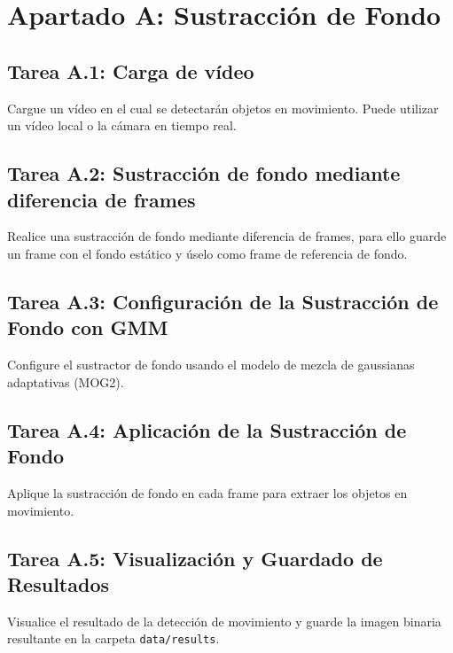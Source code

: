 \chapter{Apartado A: \textbf{Sustracción de Fondo}}
\label{chapter:tarea_a}


\section*{Tarea A.1: Carga de vídeo}
{}
Cargue un vídeo en el cual se detectarán objetos en movimiento. Puede utilizar un vídeo local o la cámara en tiempo real.

\section*{Tarea A.2: Sustracción de fondo mediante diferencia de frames}
{}
Realice una sustracción de fondo mediante diferencia de frames, para ello guarde un frame con el fondo estático y úselo como frame de referencia de fondo.

\section*{Tarea A.3: Configuración de la Sustracción de Fondo con GMM}
{}

Configure el sustractor de fondo usando el modelo de mezcla de gaussianas adaptativas (MOG2).

\section*{Tarea A.4: Aplicación de la Sustracción de Fondo}
{}
Aplique la sustracción de fondo en cada frame para extraer los objetos en movimiento.

\section*{Tarea A.5: Visualización y Guardado de Resultados}
{}
Visualice el resultado de la detección de movimiento y guarde la imagen binaria resultante en la carpeta \texttt{data/results}.

